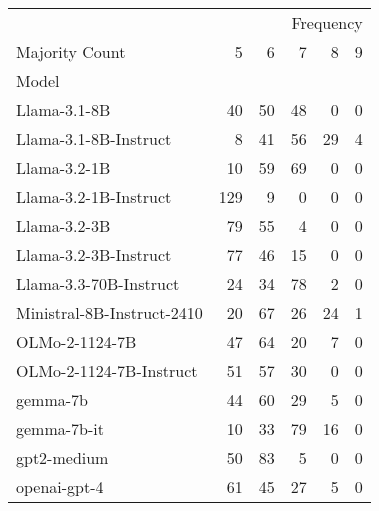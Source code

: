 \begin{tabular}{lrrrrr}
\toprule
 & \multicolumn{5}{r}{Frequency} \\
Majority Count & 5 & 6 & 7 & 8 & 9 \\
Model &  &  &  &  &  \\
\midrule
Llama-3.1-8B & 40 & 50 & 48 & 0 & 0 \\
Llama-3.1-8B-Instruct & 8 & 41 & 56 & 29 & 4 \\
Llama-3.2-1B & 10 & 59 & 69 & 0 & 0 \\
Llama-3.2-1B-Instruct & 129 & 9 & 0 & 0 & 0 \\
Llama-3.2-3B & 79 & 55 & 4 & 0 & 0 \\
Llama-3.2-3B-Instruct & 77 & 46 & 15 & 0 & 0 \\
Llama-3.3-70B-Instruct & 24 & 34 & 78 & 2 & 0 \\
Ministral-8B-Instruct-2410 & 20 & 67 & 26 & 24 & 1 \\
OLMo-2-1124-7B & 47 & 64 & 20 & 7 & 0 \\
OLMo-2-1124-7B-Instruct & 51 & 57 & 30 & 0 & 0 \\
gemma-7b & 44 & 60 & 29 & 5 & 0 \\
gemma-7b-it & 10 & 33 & 79 & 16 & 0 \\
gpt2-medium & 50 & 83 & 5 & 0 & 0 \\
openai-gpt-4 & 61 & 45 & 27 & 5 & 0 \\
\bottomrule
\end{tabular}
